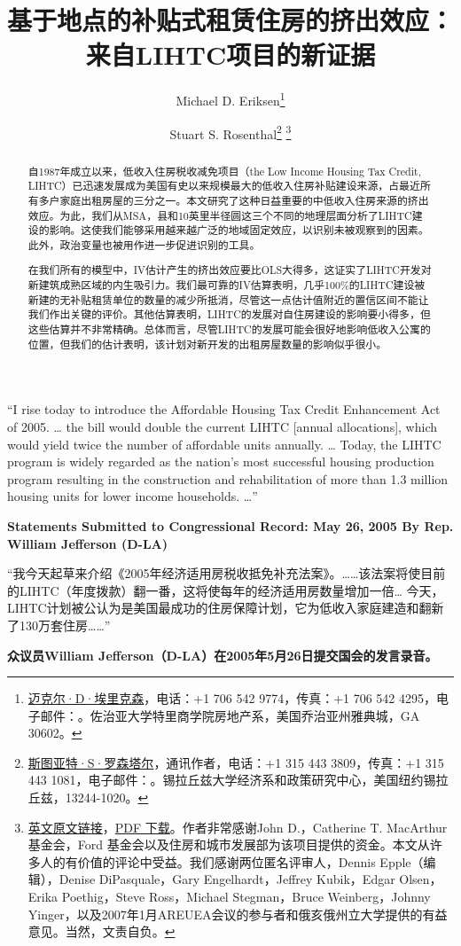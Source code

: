 \documentclass[lang=cn,11pt,a4paper]{paper}
\title{基于地点的补贴式租赁住房的挤出效应：来自LIHTC项目的新证据}
\author{Michael D. Eriksen\thanks{\href{http://www.eriksen.myweb.uga.edu}{迈克尔·D·埃里克森}，电话：+1 706 542 9774，传真：+1 706 542 4295，电子邮件：\email{eriksen@terry.uga.edu}。佐治亚大学特里商学院房地产系，美国乔治亚州雅典城，GA 30602。} \and Stuart S. Rosenthal\thanks{\href{http://www.faculty.maxwell.syr.edu/rosenthal}{斯图亚特·S·罗森塔尔}，通讯作者，电话：+1 315 443 3809，传真：+1 315 443 1081，电子邮件：\email{ssrosent@maxwell.syr.edu}。锡拉丘兹大学经济系和政策研究中心，美国纽约锡拉丘兹，13244-1020。}\; \thanks{\href{https://www.sciencedirect.com/science/article/pii/S0047272710000885}{\faLink\;英文原文链接}，\href{https://sci-hub.tw/10.1016/j.jpubeco.2010.07.002}{\faFilePdf[regular]\;PDF 下载}。作者非常感谢John D.，Catherine T. MacArthur 基金会，Ford 基金会以及住房和城市发展部为该项目提供的资金。本文从许多人的有价值的评论中受益。我们感谢两位匿名评审人，Dennis Epple（编辑），Denise DiPasquale，Gary Engelhardt，Jeffrey Kubik，Edgar Olsen，Erika Poethig，Steve Ross，Michael Stegman，Bruce Weinberg，Johnny Yinger，以及2007年1月AREUEA会议的参与者和俄亥俄州立大学提供的有益意见。当然，文责自负。}}
\date{\zhtoday}
\begin{document}
\maketitle

\begin{abstract}
  \hspace{2\ccwd}自1987年成立以来，低收入住房税收减免项目（the Low Income Housing Tax Credit, LIHTC）已迅速发展成为美国有史以来规模最大的低收入住房补贴建设来源，占最近所有多户家庭出租房屋的三分之一。本文研究了这种日益重要的中低收入住房来源的挤出效应。为此，我们从MSA，县和10英里半径圆这三个不同的地理层面分析了LIHTC建设的影响。这使我们能够采用越来越广泛的地域固定效应，以识别未被观察到的因素。此外，政治变量也被用作进一步促进识别的工具。
  
  \!在我们所有的模型中，IV估计产生的挤出效应要比OLS大得多，这证实了LIHTC开发对新建筑成熟区域的内生吸引力。我们最可靠的IV估算表明，几乎100\%的LIHTC建设被新建的无补贴租赁单位的数量的减少所抵消，尽管这一点估计值附近的置信区间不能让我们作出关键的评价。其他估算表明，LIHTC的发展对自住房建设的影响要小得多，但这些估算并不非常精确。总体而言，尽管LIHTC的发展可能会很好地影响低收入公寓的位置，但我们的估计表明，该计划对新开发的出租房屋数量的影响似乎很小。

\end{abstract}
\vspace{10pt}

\begin{tcolorbox}[
	colback=yellow!10!white,
  colframe=red!30!black,
  fontupper = \itshape,
]
“I rise today to introduce the Affordable Housing Tax Credit Enhancement Act of 2005. … the bill would double the current LIHTC [annual allocations], which would yield twice the number of affordable units annually. … Today, the LIHTC program is widely regarded as the nation's most successful housing production program resulting in the construction and rehabilitation of more than 1.3 million housing units for lower income households. …”
\vspace{5pt}

\textbf{Statements Submitted to Congressional Record: May 26, 2005 By Rep. William Jefferson (D-LA)}

\tcblower

“我今天起草来介绍《2005年经济适用房税收抵免补充法案》。……该法案将使目前的LIHTC（年度拨款）翻一番，这将使每年的经济适用房数量增加一倍… 今天，LIHTC计划被公认为是美国最成功的住房保障计划，它为低收入家庭建造和翻新了130万套住房……”
\vspace{5pt}

\textbf{众议员William Jefferson（D-LA）在2005年5月26日提交国会的发言录音。}

\end{tcolorbox}
\vspace{10pt}
\end{document}
